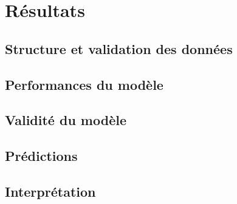 \chapter{Résultats}
	\section{Structure et validation des données}   %
	\section{Performances du modèle}                  %
	\section{Validité du modèle}                      %
	\section{Prédictions}                             %
	\section{Interprétation}                          %
